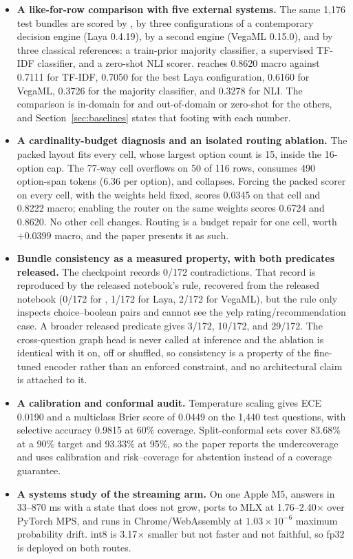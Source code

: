 \begin{itemize}
\item \textbf{A like-for-row comparison with five external systems.} The same 1{,}176 test
bundles are scored by \vsix{}, by three configurations of a contemporary decision engine
(Laya 0.4.19), by a second engine (VegaML 0.15.0), and by three classical references: a
train-prior majority classifier, a supervised TF-IDF classifier, and a zero-shot NLI scorer.
\vsix{} reaches 0.8620 macro against 0.7111 for TF-IDF, 0.7050 for the best Laya configuration,
0.6160 for VegaML, 0.3726 for the majority classifier, and 0.3278 for NLI. The comparison is
in-domain for \vsix{} and out-of-domain or zero-shot for the others, and
Section~\ref{sec:baselines} states that footing with each number.
\item \textbf{A cardinality-budget diagnosis and an isolated routing ablation.} The packed
layout fits every cell, whose largest option count is 15, inside the 16-option cap. The 77-way cell overflows on 50 of 116 rows,
consumes 490 option-span tokens (6.36 per option), and collapses. Forcing the packed scorer on
every cell, with the weights held fixed, scores 0.0345 on that cell and 0.8222 macro; enabling
the router on the same weights scores 0.6724 and 0.8620. No other cell changes. Routing is a
budget repair for one cell, worth $+0.0399$ macro, and the paper presents it as such.
\item \textbf{Bundle consistency as a measured property, with both predicates released.} The
checkpoint records 0/172 contradictions. That record is reproduced by the released notebook's rule,
recovered from the released notebook (0/172 for \vsix{}, 1/172 for Laya, 2/172 for VegaML), but
the rule only inspects choice--boolean pairs and cannot see the yelp rating/recommendation case. A
broader released predicate gives 3/172, 10/172, and 29/172. The
cross-question graph head is never called at inference and the ablation is identical with it on,
off or shuffled, so consistency is a property of the fine-tuned encoder rather than an enforced
constraint, and no architectural claim is attached to it.
\item \textbf{A calibration and conformal audit.} Temperature scaling gives ECE 0.0190 and a
multiclass Brier score of 0.0449 on the 1{,}440 test questions, with selective accuracy 0.9815 at
60\% coverage. Split-conformal sets cover 83.68\% at a 90\% target and 93.33\% at 95\%, so the
paper reports the undercoverage and uses calibration and risk--coverage for abstention instead of
a coverage guarantee.
\item \textbf{A systems study of the streaming arm.} On one Apple M5, \stream{} answers in
33--870 ms with a state that does not grow, ports to MLX at 1.76--2.40$\times$ over PyTorch MPS,
and runs in Chrome/WebAssembly at $1.03\times10^{-6}$ maximum probability drift. int8 is 3.17$\times$
smaller but not faster and not faithful, so fp32 is deployed on both routes.
\end{itemize}

